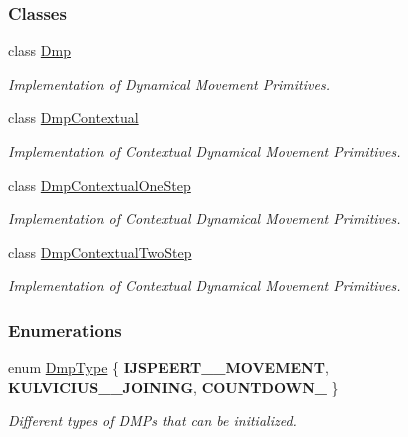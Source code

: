 \subsubsection*{Classes}
\begin{DoxyCompactItemize}
\item 
class \hyperlink{classDmpBbo_1_1Dmp}{Dmp}
\begin{DoxyCompactList}\small\item\em Implementation of Dynamical Movement Primitives. \end{DoxyCompactList}\item 
class \hyperlink{classDmpBbo_1_1DmpContextual}{Dmp\+Contextual}
\begin{DoxyCompactList}\small\item\em Implementation of Contextual Dynamical Movement Primitives. \end{DoxyCompactList}\item 
class \hyperlink{classDmpBbo_1_1DmpContextualOneStep}{Dmp\+Contextual\+One\+Step}
\begin{DoxyCompactList}\small\item\em Implementation of Contextual Dynamical Movement Primitives. \end{DoxyCompactList}\item 
class \hyperlink{classDmpBbo_1_1DmpContextualTwoStep}{Dmp\+Contextual\+Two\+Step}
\begin{DoxyCompactList}\small\item\em Implementation of Contextual Dynamical Movement Primitives. \end{DoxyCompactList}\end{DoxyCompactItemize}
\subsubsection*{Enumerations}
\begin{DoxyCompactItemize}
\item 
enum \hyperlink{group__Dmps_gaccba8d09ec99ae66e469b3511bb232a4}{Dmp\+Type} \{ {\bfseries I\+J\+S\+P\+E\+E\+R\+T\+\_\+\_\+\+M\+O\+V\+E\+M\+E\+N\+T}, 
{\bfseries K\+U\+L\+V\+I\+C\+I\+U\+S\+\_\+\_\+\+J\+O\+I\+N\+I\+N\+G}, 
{\bfseries C\+O\+U\+N\+T\+D\+O\+W\+N\+\_}
 \}
\begin{DoxyCompactList}\small\item\em Different types of D\+M\+Ps that can be initialized. \end{DoxyCompactList}\end{DoxyCompactItemize}


